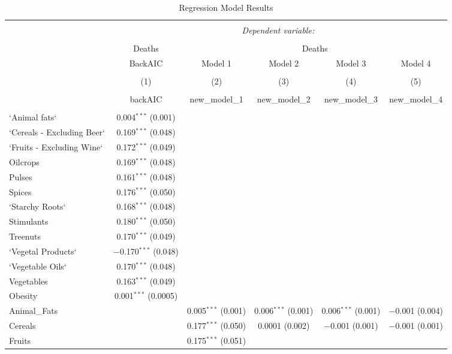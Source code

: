 \documentclass[
]{article}
\begin{document}
\begin{table}[!htbp] \centering 
  \caption{Regression Model Results} 
  \label{} 
\small 
\begin{tabular}{@{\extracolsep{-15pt}}lccccc} 
\\[-1.8ex]\hline 
\hline \\[-1.8ex] 
 & \multicolumn{5}{c}{\textit{Dependent variable:}} \\ 
\cline{2-6} 
\\[-1.8ex] & Deaths & \multicolumn{4}{c}{Deaths} \\ 
 & BackAIC & Model 1 & Model 2 & Model 3 & Model 4 \\ 
\\[-1.8ex] & (1) & (2) & (3) & (4) & (5)\\ 
\\[-1.8ex] & backAIC & new_model_1 & new_model_2 & new_model_3 & new_model_4\\ 
\hline \\[-1.8ex] 
 `Animal fats` & 0.004$^{***}$ (0.001) &  &  &  &  \\ 
  `Cereals - Excluding Beer` & 0.169$^{***}$ (0.048) &  &  &  &  \\ 
  `Fruits - Excluding Wine` & 0.172$^{***}$ (0.049) &  &  &  &  \\ 
  Oilcrops & 0.169$^{***}$ (0.048) &  &  &  &  \\ 
  Pulses & 0.161$^{***}$ (0.048) &  &  &  &  \\ 
  Spices & 0.176$^{***}$ (0.050) &  &  &  &  \\ 
  `Starchy Roots` & 0.168$^{***}$ (0.048) &  &  &  &  \\ 
  Stimulants & 0.180$^{***}$ (0.050) &  &  &  &  \\ 
  Treenuts & 0.170$^{***}$ (0.049) &  &  &  &  \\ 
  `Vegetal Products` & $-$0.170$^{***}$ (0.048) &  &  &  &  \\ 
  `Vegetable Oils` & 0.170$^{***}$ (0.048) &  &  &  &  \\ 
  Vegetables & 0.163$^{***}$ (0.049) &  &  &  &  \\ 
  Obesity & 0.001$^{***}$ (0.0005) &  &  &  &  \\ 
  Animal\_Fats &  & 0.005$^{***}$ (0.001) & 0.006$^{***}$ (0.001) & 0.006$^{***}$ (0.001) & $-$0.001 (0.004) \\ 
  Cereals &  & 0.177$^{***}$ (0.050) & 0.0001 (0.002) & $-$0.001 (0.001) & $-$0.001 (0.001) \\ 
  Fruits &  & 0.175$^{***}$ (0.051) &  &  &  \\ 

\end{tabular}
\end{table}
\end{document}
